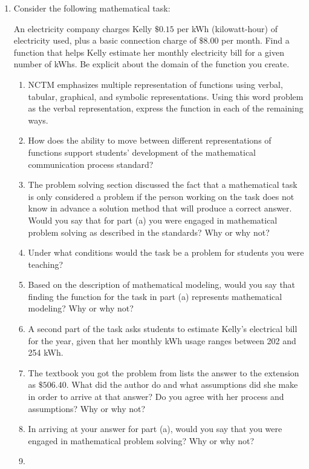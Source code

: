 \documentclass[
]{book}
\theoremstyle{definition}
\theoremstyle{definition}
\theoremstyle{definition}
\theoremstyle{remark}
\begin{document}
\begin{enumerate}
\def\labelenumi{\arabic{enumi}.}
\item
  Consider the following mathematical task:

  An electricity company charges Kelly \(\$0.15\) per kWh (kilowatt-hour) of electricity used, plus a basic connection charge of \(\$8.00\) per month. Find a function that helps Kelly estimate her monthly electricity bill for a given number of kWhs. Be explicit about the domain of the function you create.

  \begin{enumerate}
  \def\labelenumii{\alph{enumii})}
  \item
    NCTM emphasizes multiple representation of functions using verbal, tabular, graphical, and symbolic representations. Using this word problem as the verbal representation, express the function in each of the remaining ways.
  \item
    How does the ability to move between different representations of functions support students' development of the mathematical communication process standard?
  \item
    The problem solving section discussed the fact that a mathematical task is only considered a problem if the person working on the task does not know in advance a solution method that will produce a correct answer. Would you say that for part (a) you were engaged in mathematical problem solving as described in the standards? Why or why not?
  \item
    Under what conditions would the task be a problem for students you were teaching?
  \item
    Based on the description of mathematical modeling, would you say that finding the function for the task in part (a) represents mathematical modeling? Why or why not?
  \item
    A second part of the task asks students to estimate Kelly's electrical bill for the year, given that her monthly kWh usage ranges between 202 and 254 kWh.
  \item
    The textbook you got the problem from lists the answer to the extension as \(\$506.40\). What did the author do and what assumptions did she make in order to arrive at that answer? Do you agree with her process and assumptions? Why or why not?
  \item
    In arriving at your answer for part (a), would you say that you were engaged in mathematical problem solving? Why or why not?
  \item

\end{enumerate}
\end{enumerate}
\end{document}
